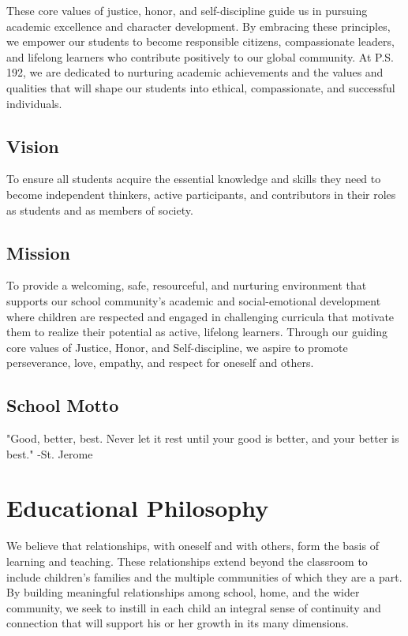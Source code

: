 \documentclass[letterpaper, 11pt]{article}
\begin{document}
These core values of justice, honor, and self-discipline guide us in pursuing academic excellence and character development. By embracing these principles, we empower our students to become responsible citizens, compassionate leaders, and lifelong learners who contribute positively to our global community. At P.S. 192, we are dedicated to nurturing academic achievements and the values and qualities that will shape our students into ethical, compassionate, and successful individuals.

\subsection{Vision}
\label{sec:org6f22c6a}
To ensure all students acquire the essential knowledge and skills they need to become independent thinkers, active participants, and contributors in their roles as students and as members of society.

\subsection{Mission}
\label{sec:orgfb3df4d}
To provide a welcoming, safe, resourceful, and nurturing environment that supports our school community's academic and social-emotional development where children are respected and engaged in challenging curricula that motivate them to realize their potential as active, lifelong learners. Through our guiding core values of Justice, Honor, and Self-discipline, we aspire to promote perseverance, love, empathy, and respect for oneself and others.

\subsection{School Motto}
\label{sec:org5a14ad7}
"Good, better, best. Never let it rest until your good is better, and your better is best."  -St. Jerome

\section{Educational Philosophy}
\label{sec:orge474d69}
We believe that relationships, with oneself and with others, form the basis of learning and teaching. These relationships extend beyond the classroom to include children’s families and the multiple communities of which they are a part. By building meaningful relationships among school, home, and the wider community, we seek to instill in each child an integral sense of continuity and connection that will support his or her growth in its many dimensions.
\end{document}
